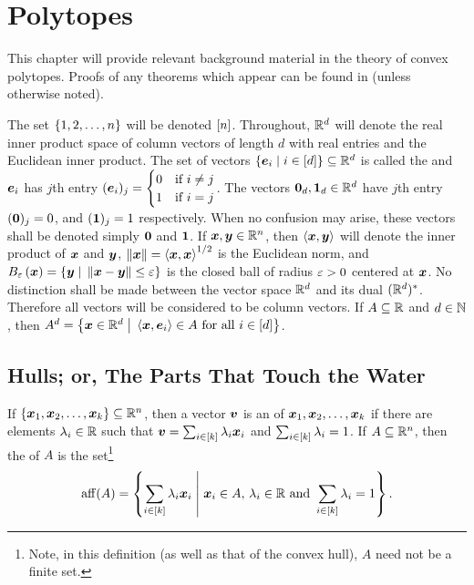 \chapter{Polytopes}

This chapter will provide relevant background material in the theory of convex polytopes.  Proofs of any theorems which appear can be found in \cite{McMullenBook} (unless otherwise noted).

  The set \(\left\{1,2,\dotsc, n\right\}\) will be denoted \(\left[n\right]\).  Throughout, \(\mathbb{R}^{d}\) will denote the real inner product space of column vectors of length \(d\) with real entries and the Euclidean inner product.  The set of vectors \(\setb{\ve e_i}{i\in\brac d}\sbset\R d\) is called the  and \(\bm{e}_i\) has \(j\)th entry \((\bm{e}_i)_j=\begin{cases}0&\text{if }i\ne j\\ 1&\text{if }i=j\end{cases}\).  The vectors \(\bm{0}_d, \bm{1}_d\in\mathbb{R}^{d}\) have \(j\)th entry \((\bm{0})_j=0\), and \((\bm{1})_j=1\) respectively.  When no confusion may arise, these vectors shall be denoted simply \(\bm{0}\) and \(\bm{1}\).  If \(\bm{x}, \bm{y}\in\mathbb{R}^{n}\), then \(\left\langle\bm{x},\bm{y}\right\rangle\) will denote the inner product of \(\bm{x}\) and \(\bm{y}\), \(\left\lVert\bm{x}\right\rVert=\left\langle\bm{x},\bm{x}\right\rangle^{1/2}\) is the Euclidean norm, and \(\B\eps{\ve x}=\setb{\ve y}{\norm{\ve x-\ve y}\le\eps}\) is the closed ball of radius \(\varepsilon>0\) centered at \(\bm{x}\). No distinction shall be made between the vector space \(\mathbb{R}^{d}\) and its dual \((\mathbb{R}^{d})^\ast\).  Therefore all vectors will be considered to be column vectors.  If \(A\subseteq\mathbb{R}\) and \(d\in\mathbb{N}\), then \(A^d=\setb{\ve x\in\R d}{\ip{\ve x}{\ve e_i}\in A\text{ for all }i\in\brac d}\).

\section{Hulls; or, The Parts That Touch the Water}

If \(\left\{\bm{x}_1,\bm{x}_2,\dotsc, \bm{x}_k\right\}\subseteq \mathbb{R}^{n}\), then a vector \(\bm{v}\) is an  of \(\bm{x}_1,\bm{x}_2,\dotsc, \bm{x}_k\) if there are elements \(\lambda_i\in\mathbb{R}\) such that \(\bm{v} = \sum_{i\in\left[k\right]}\lambda_i\bm{x}_i\) and \(\sum_{i\in\left[k\right]}\lambda_i=1\).  If \(A\subseteq \mathbb{R}^{n}\), then the  of \(A\) is the set\footnote{Note, in this definition (as well as that of the convex hull), \(A\) need not be a finite set.}
    \[
        \aff(A)
            =\setb{\sum_{i\in\brac k}\la_i\ve x_i}{\ve x_i\in A,\,\la_i\in \RR\text{ and }\sum_{i\in\brac k}\la_i=1}.
    \]

